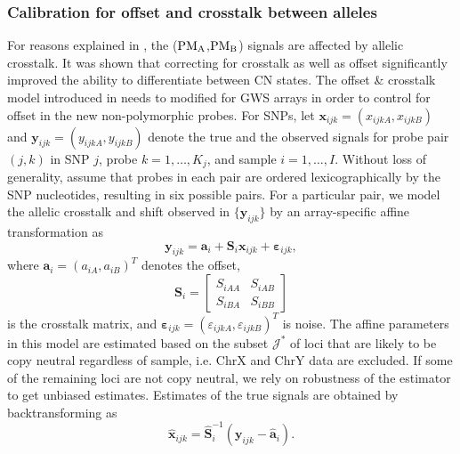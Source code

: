 \documentclass{bioinfo}
\newcommand{\GWS}{GWS\xspace}
\newcommand{\GWSFive}{GWS5\xspace}
\newcommand{\PMA}{\ensuremath{\textnormal{PM}_\textnormal{A}}\xspace}
\newcommand{\PMB}{\ensuremath{\textnormal{PM}_\textnormal{B}}\xspace}
\newcommand{\bx}{\mathbf{x}\xspace}
\newcommand{\by}{\mathbf{y}\xspace}
\newcommand{\ba}{\mathbf{a}\xspace}
\newcommand{\bS}{\mathbf{S}\xspace}
\newcommand{\beps}{\bm{\varepsilon}\xspace}
\begin{document}
\subsubsection{Calibration for offset and crosstalk between alleles}
\label{secModelACC}
For reasons explained in \citet{BengtssonH_etal_2008a}, the (\PMA,\PMB) signals are affected by allelic crosstalk.  It was shown that correcting for crosstalk as well as offset significantly improved the ability to differentiate between CN states.
The offset \& crosstalk model introduced in \citet{BengtssonH_etal_2008a} needs to modified for \GWS arrays in order to control for offset in the new non-polymorphic probes.  
For SNPs, let $\bx_{ijk} = (x_{ijkA}, x_{ijkB})$ and $\by_{ijk} = (y_{ijkA}, y_{ijkB})$ denote the true and the observed signals for probe pair $(j,k)$ in SNP $j$, probe $k=1,\ldots,K_j$, and sample $i=1,\ldots,I$.  
Without loss of generality, assume that probes in each pair are ordered lexicographically by the SNP nucleotides, resulting in six possible pairs.  For a particular pair, we model the allelic crosstalk and shift observed in $\{\by_{ijk}\}$ by an array-specific affine transformation as
\begin{equation}
  \by_{ijk} = \ba_i + \bS_i \bx_{ijk} + \beps_{ijk},
  \label{eqnACCi}
\end{equation}
where $\ba_i = (a_{iA}, a_{iB})^T$ denotes the offset, 
\begin{equation}
 \bS_i = 
 \begin{bmatrix}
   S_{iAA} & S_{iAB} \\
   S_{iBA} & S_{iBB}
 \end{bmatrix}
  \label{eqnACCii}
\end{equation}
is the crosstalk matrix, and $\beps_{ijk} = (\varepsilon_{ijkA}, \varepsilon_{ijkB})^T$ is noise.  The affine parameters in this model are estimated based on the subset $\mathcal{J^*}$ of loci that are likely to be copy neutral regardless of sample, i.e. ChrX and ChrY data are excluded.  If some of the remaining loci are not copy neutral, we rely on robustness of the estimator to get unbiased estimates.
Estimates of the true signals
are obtained by backtransforming as
\begin{equation}
  \hat{\bx}_{ijk} = \hat{\bS}^{-1}_i (\by_{ijk} - \hat{\ba}_i).
  \label{eqnACCiii}
\end{equation}
\end{document}
